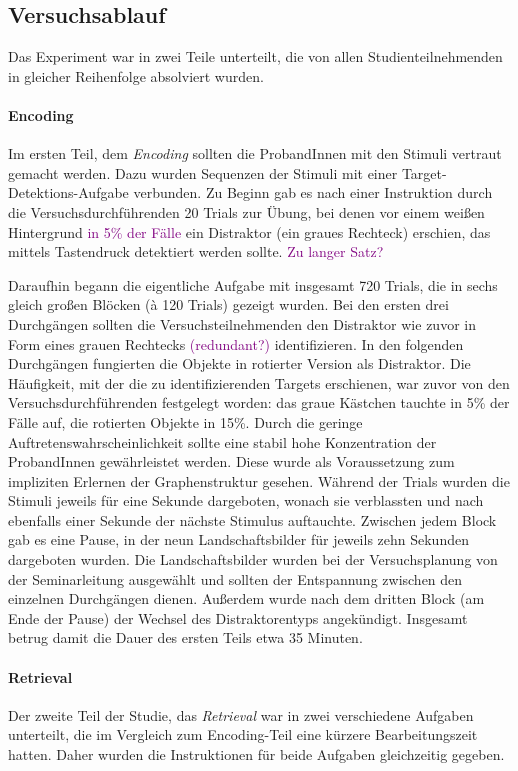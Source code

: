 \subsection{Versuchsablauf}
Das Experiment war in zwei Teile unterteilt, die von allen Studienteilnehmenden in gleicher Reihenfolge absolviert wurden.

\paragraph{Encoding} Im ersten Teil, dem \textit{Encoding} sollten die ProbandInnen mit den Stimuli vertraut gemacht werden. Dazu wurden Sequenzen der Stimuli mit einer Target-Detektions-Aufgabe verbunden. Zu Beginn gab es nach einer Instruktion durch die Versuchsdurchführenden 20 Trials zur Übung, bei denen vor einem weißen Hintergrund \textcolor{purple}{in 5\% der Fälle} ein Distraktor (ein graues Rechteck) erschien, das mittels Tastendruck detektiert werden sollte. \textcolor{purple}{Zu langer Satz?}

Daraufhin begann die eigentliche Aufgabe mit insgesamt 720 Trials, die in sechs gleich großen Blöcken (à 120 Trials) gezeigt wurden. Bei den ersten drei Durchgängen sollten die Versuchsteilnehmenden den Distraktor wie zuvor in Form eines grauen Rechtecks \textcolor{purple}{(redundant?)} identifizieren. In den folgenden Durchgängen fungierten die Objekte in rotierter Version als Distraktor. Die Häufigkeit, mit der die zu identifizierenden Targets erschienen, war zuvor von den Versuchsdurchführenden festgelegt worden: das graue Kästchen tauchte in 5\% der Fälle auf, die rotierten Objekte in 15\%. Durch die geringe Auftretenswahrscheinlichkeit sollte eine stabil hohe Konzentration der ProbandInnen gewährleistet werden. Diese wurde als Voraussetzung zum impliziten Erlernen der Graphenstruktur gesehen.
Während der Trials wurden die Stimuli jeweils für eine Sekunde dargeboten, wonach sie verblassten und nach ebenfalls einer Sekunde der nächste Stimulus auftauchte. Zwischen jedem Block gab es eine Pause, in der neun Landschaftsbilder für jeweils zehn Sekunden dargeboten wurden. Die Landschaftsbilder wurden bei der Versuchsplanung von der Seminarleitung ausgewählt und sollten der Entspannung zwischen den einzelnen Durchgängen dienen. Außerdem wurde nach dem dritten Block (am Ende der Pause) der Wechsel des Distraktorentyps angekündigt. Insgesamt betrug damit die Dauer des ersten Teils etwa 35 Minuten.

\paragraph{Retrieval} Der zweite Teil der Studie, das \textit{Retrieval} war in zwei verschiedene Aufgaben unterteilt, die im Vergleich zum Encoding-Teil eine kürzere Bearbeitungszeit hatten. Daher wurden die Instruktionen für beide Aufgaben gleichzeitig gegeben.

